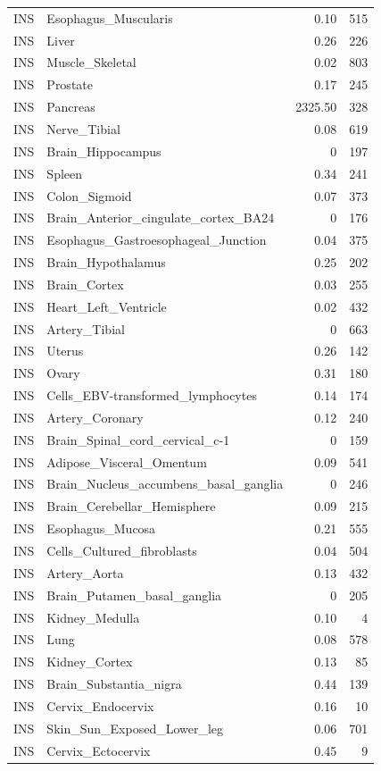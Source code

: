 \begin{footnotesize}
\begin{longtable}{llrr}
INS & Esophagus\_Muscularis & 0.10 & 515 \\
INS & Liver & 0.26 & 226 \\
INS & Muscle\_Skeletal & 0.02 & 803 \\
INS & Prostate & 0.17 & 245 \\
INS & Pancreas & 2325.50 & 328 \\
INS & Nerve\_Tibial & 0.08 & 619 \\
INS & Brain\_Hippocampus & 0 & 197 \\
INS & Spleen & 0.34 & 241 \\
INS & Colon\_Sigmoid & 0.07 & 373 \\
INS & Brain\_Anterior\_cingulate\_cortex\_BA24 & 0 & 176 \\
INS & Esophagus\_Gastroesophageal\_Junction & 0.04 & 375 \\
INS & Brain\_Hypothalamus & 0.25 & 202 \\
INS & Brain\_Cortex & 0.03 & 255 \\
INS & Heart\_Left\_Ventricle & 0.02 & 432 \\
INS & Artery\_Tibial & 0 & 663 \\
INS & Uterus & 0.26 & 142 \\
INS & Ovary & 0.31 & 180 \\
INS & Cells\_EBV-transformed\_lymphocytes & 0.14 & 174 \\
INS & Artery\_Coronary & 0.12 & 240 \\
INS & Brain\_Spinal\_cord\_cervical\_c-1 & 0 & 159 \\
INS & Adipose\_Visceral\_Omentum & 0.09 & 541 \\
INS & Brain\_Nucleus\_accumbens\_basal\_ganglia & 0 & 246 \\
INS & Brain\_Cerebellar\_Hemisphere & 0.09 & 215 \\
INS & Esophagus\_Mucosa & 0.21 & 555 \\
INS & Cells\_Cultured\_fibroblasts & 0.04 & 504 \\
INS & Artery\_Aorta & 0.13 & 432 \\
INS & Brain\_Putamen\_basal\_ganglia & 0 & 205 \\
INS & Kidney\_Medulla & 0.10 & 4 \\
INS & Lung & 0.08 & 578 \\
INS & Kidney\_Cortex & 0.13 & 85 \\
INS & Brain\_Substantia\_nigra & 0.44 & 139 \\
INS & Cervix\_Endocervix & 0.16 & 10 \\
INS & Skin\_Sun\_Exposed\_Lower\_leg & 0.06 & 701 \\
INS & Cervix\_Ectocervix & 0.45 & 9 \\
\end{longtable}\end{footnotesize}
